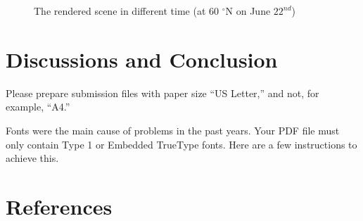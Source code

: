\documentclass{article}
\begin{document}
\begin{itemize}
\begin{figure}[h]
  \hfill
  \hfill

  \caption{The rendered scene in different time (at 60 $^{\circ}$N on June \(22^{nd}\))}
  \label{fig:AllL60N}
\end{figure}

\section{Discussions and Conclusion}
Please prepare submission files with paper size ``US Letter,'' and not, for
example, ``A4.''


Fonts were the main cause of problems in the past years. Your PDF file must only
contain Type 1 or Embedded TrueType fonts. Here are a few instructions to
achieve this.


\section*{References}


\end{itemize}
\end{document}
